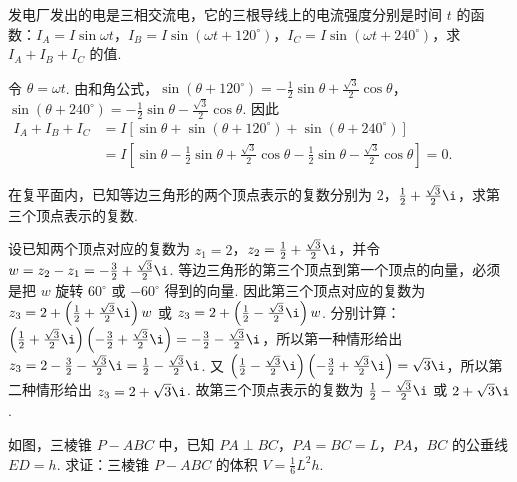 \begin{problem}
发电厂发出的电是三相交流电，它的三根导线上的电流强度分别是时间 \(t\) 的函数：\(I_A = I\sin \omega t\)，\(I_B = I\sin(\omega t + 120^\circ)\)，\(I_C = I\sin(\omega t + 240^\circ)\)，求 \(I_A + I_B + I_C\) 的值.
\end{problem}

\begin{solution}
令 \(\theta=\omega t\). 由和角公式，\(\sin(\theta+120^\circ)=-\frac12\sin\theta+\frac{\sqrt3}{2}\cos\theta\)，\(\sin(\theta+240^\circ)=-\frac12\sin\theta-\frac{\sqrt3}{2}\cos\theta\). 因此
\(\begin{aligned}
I_A+I_B+I_C
&=I\left[\sin\theta+\sin(\theta+120^\circ)+\sin(\theta+240^\circ)\right]\\
&=I\left[\sin\theta-\frac12\sin\theta+\frac{\sqrt3}{2}\cos\theta-\frac12\sin\theta-\frac{\sqrt3}{2}\cos\theta\right]=0.
\end{aligned}\)
\end{solution}

\begin{problem}
在复平面内，已知等边三角形的两个顶点表示的复数分别为 \(2\)，\(\frac{1}{2} + \frac{\sqrt{3}}{2}\i\)，求第三个顶点表示的复数.
\end{problem}

\begin{solution}
设已知两个顶点对应的复数为 \(z_1=2\)，\(z_2=\frac12+\frac{\sqrt3}{2}\i\)，并令 \(w=z_2-z_1=-\frac32+\frac{\sqrt3}{2}\i\). 等边三角形的第三个顶点到第一个顶点的向量，必须是把 \(w\) 旋转 \(60^\circ\) 或 \(-60^\circ\) 得到的向量. 因此第三个顶点对应的复数为 \(z_3=2+\left(\frac12+\frac{\sqrt3}{2}\i\right)w\) 或 \(z_3=2+\left(\frac12-\frac{\sqrt3}{2}\i\right)w\). 分别计算：
\(\left(\frac12+\frac{\sqrt3}{2}\i\right)\left(-\frac32+\frac{\sqrt3}{2}\i\right)=-\frac32-\frac{\sqrt3}{2}\i\)，所以第一种情形给出 \(z_3=2-\frac32-\frac{\sqrt3}{2}\i=\frac12-\frac{\sqrt3}{2}\i\). 又 \(\left(\frac12-\frac{\sqrt3}{2}\i\right)\left(-\frac32+\frac{\sqrt3}{2}\i\right)=\sqrt3\i\)，所以第二种情形给出 \(z_3=2+\sqrt3\i\). 故第三个顶点表示的复数为 \(\frac12-\frac{\sqrt3}{2}\i\) 或 \(2+\sqrt3\i\).
\end{solution}

\begin{problem}
如图，三棱锥 \(P-ABC\) 中，已知 \(PA \perp BC\)，\(PA = BC = L\)，\(PA\)，\(BC\) 的公垂线 \(ED = h\). 求证：三棱锥 \(P-ABC\) 的体积 \(V = \frac{1}{6}L^2h\).

\end{problem}

